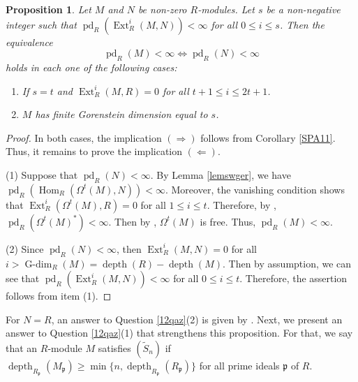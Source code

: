 \documentclass[11pt, a4paper,pagebackref]{amsart}
\numberwithin{equation}{section}
\newtheorem{proposition}[theorem]{Proposition}
\theoremstyle{definition}
\newtheorem{remark}[theorem]{Remark}
\newtheorem{remark and definition}[theorem]{Remark and Definition}
\newtheorem{remark and notation}[theorem]{Remark and Notation}
\newcommand\Hom{\operatorname{Hom}}
\newcommand\Ext{\operatorname{Ext}}
\newcommand\depth{\operatorname{depth}}
\begin{document}
\begin{proposition} \label{newprop}
    Let $M$ and $N$ be non-zero $R$-modules. Let $s$ be a non-negative integer such that $\operatorname{pd}_R(\Ext_R^i(M,N))<\infty$ for all $0\leq i \leq s$.  Then the equivalence $$\operatorname{pd}_R(M)<\infty \Longleftrightarrow \operatorname{pd}_R(N)<\infty$$
    holds in each one of the following cases:
    \begin{enumerate}[\rm (1)]
    \item If $s=t$ and $\Ext_R^i(M,R)=0$ for all $t+1\leq i \leq 2t+1$. 
        \item  $M$ has finite Gorenstein dimension equal to $s$.
    \end{enumerate}
\end{proposition}

\begin{proof}
In both cases, the implication $(\Rightarrow)$ follows from Corollary \ref{SPA11}. Thus, it remains to prove the implication $(\Leftarrow)$.


    (1) Suppose that  $\operatorname{pd}_R(N)<\infty$. By Lemma \ref{lemswger}, we have \linebreak $\operatorname{pd}_R(\Hom_R(\Omega^t(M), N))<\infty$.  Moreover,  the vanishing condition shows that \linebreak $\Ext_R^i(\Omega^t(M), R)=0$ for all $1\leq i \leq t$. Therefore, by  \cite[Proposition 19]{HomologicalDimensionsTheGorensteinPropertyAndSpecialCasesOfSomeConjectures}, $\operatorname{pd}_R(\Omega^t (M)^\ast)<\infty$. Then by \cite[Proposition 13]{HomologicalDimensionsTheGorensteinPropertyAndSpecialCasesOfSomeConjectures}, $\Omega^t(M)$ is free. Thus, $\operatorname{pd}_R(M)<\infty$. 

    (2) Since $\operatorname{pd}_R(N)<\infty$, then $\Ext_R^i(M,N)=0$ for all $i>\operatorname{G-dim}_R(M)=\depth(R)-\depth(M)$. Then by assumption, we can see that $\operatorname{pd}_R(\Ext_R^i(M,N))<\infty$ for all $0\leq i \leq t$. Therefore, the assertion follows from item (1).
    \end{proof}


For $N=R$, an answer to Question \ref{12qaz}(2) is given by \cite[Proposition 13]{HomologicalDimensionsTheGorensteinPropertyAndSpecialCasesOfSomeConjectures}. Next, we present an answer to Question \ref{12qaz}(1) that strengthens this proposition. For that,  we say that an $R$-module $M$ satisfies  $(\widetilde{S}_n)$ if $\operatorname{depth}_{R_\mathfrak{p}}(M_\mathfrak{p})\geq \min\{n, \depth_{R_\mathfrak{p}}(R_\mathfrak{p})\}$ for all prime ideals $\mathfrak{p}$ of $R$. 
\end{document}

